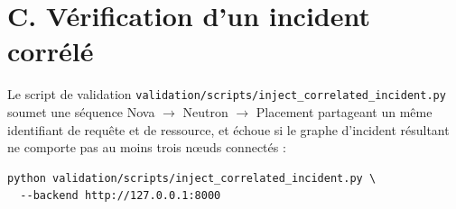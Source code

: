 \documentclass[a4paper,11pt,oneside]{report}
\begin{document}
\section*{C. Vérification d'un incident corrélé}
Le script de validation \texttt{validation/scripts/inject\_correlated\_incident.py} soumet une séquence Nova $\to$ Neutron $\to$ Placement partageant un même identifiant de requête et de ressource, et échoue si le graphe d'incident résultant ne comporte pas au moins trois nœuds connectés :
\begin{verbatim}
python validation/scripts/inject_correlated_incident.py \
  --backend http://127.0.0.1:8000
\end{verbatim}
\end{document}
